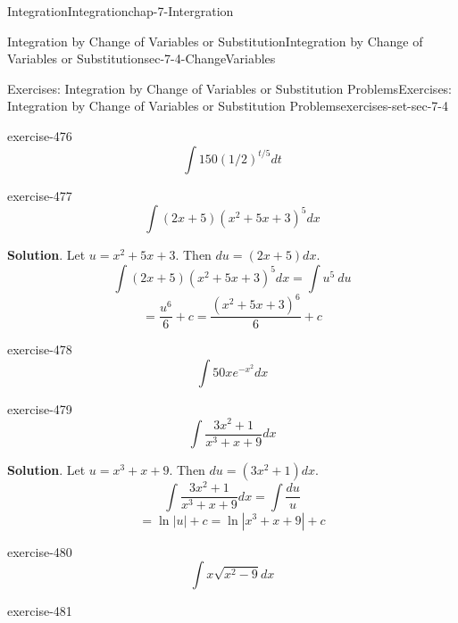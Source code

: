 \documentclass[oneside,10pt,]{book}
\numberwithin{equation}{section}
\begin{document}
\begin{chapterptx}{Integration}{}{Integration}{}{}{chap-7-Intergration}
\begin{sectionptx}{Integration by Change of Variables or Substitution}{}{Integration by Change of Variables or Substitution}{}{}{sec-7-4-ChangeVariables}
\begin{exercises-subsection-numberless}{Exercises: Integration by Change of Variables or Substitution Problems}{}{Exercises: Integration by Change of Variables or Substitution Problems}{}{}{exercises-set-sec-7-4}
\begin{divisionexercise}{8}{}{}{exercise-476}%
%
\begin{equation*}
\int 150(1/2)^{t/5}  dt
\end{equation*}
\end{divisionexercise}%
\begin{divisionexercise}{9}{}{}{exercise-477}%
%
\begin{equation*}
\int (2x+5) (x^2+5x+3)^5  dx 
\end{equation*}
\par\smallskip%
\noindent\textbf{Solution}.\hypertarget{solution-242}{}\quad%
\hypertarget{p-2860}{}%
Let \(u=x^2+5x+3\).  Then \(du=(2x+5)dx\).%
%
\begin{equation*}
\int (2x+5) (x^2+5x+3)^5  dx=\int u^5\ du
\end{equation*}
%
\begin{equation*}
=\frac{u^6}{6} +c
=\frac{(x^2+5x+3)^6}{6} +c
\end{equation*}
\end{divisionexercise}%
\begin{divisionexercise}{10}{}{}{exercise-478}%
%
\begin{equation*}
\int 50xe^{-x^2 }  dx
\end{equation*}
\end{divisionexercise}%
\begin{divisionexercise}{11}{}{}{exercise-479}%
%
\begin{equation*}
\int \frac{3x^2+1}{x^3+x+9} dx 
\end{equation*}
\par\smallskip%
\noindent\textbf{Solution}.\hypertarget{solution-243}{}\quad%
\hypertarget{p-2861}{}%
Let \(u=x^3+x+9\).  Then \(du=(3x^2+1)dx\).%
%
\begin{equation*}
\int \frac{3x^2+1}{x^3+x+9} dx=\int \frac{du}{u}
\end{equation*}
%
\begin{equation*}
=\ln|u| +c
=\ln|x^3+x+9| +c
\end{equation*}
\end{divisionexercise}%
\begin{divisionexercise}{12}{}{}{exercise-480}%
%
\begin{equation*}
\int x\sqrt{x^2-9}  dx
\end{equation*}
\end{divisionexercise}%
\begin{divisionexercise}{13}{}{}{exercise-481}%
%
\begin{equation*}

\end{equation*}
\end{divisionexercise}
\end{exercises-subsection-numberless}
\end{sectionptx}
\end{chapterptx}
\end{document}
